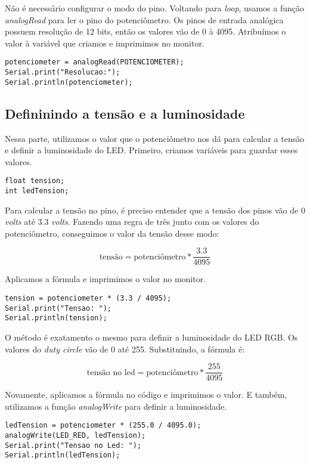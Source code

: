 Não é necessário configurar o modo do pino. Voltando para \textit{loop}, usamos a função \textit{analogRead} para ler o pino do potenciômetro. Os pinos de entrada analógica possuem resolução de 12 bits, então os valores vão de 0 à 4095. Atribuímos o valor à variável que criamos e imprimimos no monitor.

\begin{lstlisting}
potenciometer = analogRead(POTENCIOMETER);
Serial.print("Resolucao:");
Serial.println(potenciometer);
\end{lstlisting}

\subsection{Defininindo a tensão e a luminosidade}
Nessa parte, utilizamos o valor que o potenciômetro nos dá para calcular a tensão e definir a luminosidade do LED. Primeiro, criamos variáveis para guardar esses valores.

\begin{lstlisting}
float tension;
int ledTension;
\end{lstlisting}

Para calcular a tensão no pino, é preciso entender que a tensão dos pinos vão de 0 \textit{volts} até 3.3 \textit{volts}. Fazendo uma regra de três junto com os valores do potenciômetro, conseguimos o valor da tensão desse modo:

$$\text{tensão} = \text{potenciômetro} * \frac{3.3}{4095}$$

Aplicamos a fórmula e imprimimos o valor no monitor.

\begin{lstlisting}
tension = potenciometer * (3.3 / 4095);
Serial.print("Tensao: ");
Serial.println(tension);
\end{lstlisting}

O método é exatamento o mesmo para definir a luminosidade do LED RGB. Os valores do \textit{duty circle} vão de 0 até 255. Substituindo, a fórmula é:

$$\text{tensão no led} = \text{potenciômetro} * \frac{255}{4095}$$

Novamente, aplicamos a fórmula no código e imprimimos o valor. E também, utilizamos a função \textit{analogWrite} para definir a luminosidade.

\begin{lstlisting}
ledTension = potenciometer * (255.0 / 4095.0);
analogWrite(LED_RED, ledTension);
Serial.print("Tensao no Led: ");
Serial.println(ledTension);
\end{lstlisting}

